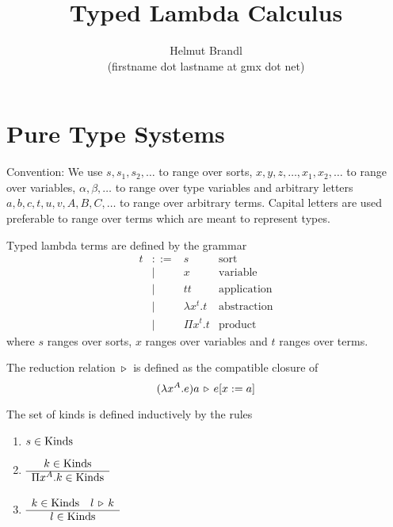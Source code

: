 \documentclass[12pt]{article}
\begin{document}
\title{Typed Lambda Calculus}
\author{Helmut Brandl \\ \scriptsize (firstname dot lastname at gmx dot net)}
\date{}


\maketitle

\abstract{
}

\tableofcontents




\newpage
\section{Pure Type Systems}

Convention: We use $s,s_1,s_2,\ldots$ to range over sorts,
$x,y,z,\ldots,x_1,x_2,\ldots$ to range over variables, $\alpha,\beta,\ldots$
to range over type variables and arbitrary letters $a,b,c,t,u,v,A,B,C,\ldots$
to range over arbitrary terms. Capital letters are used preferable to range
over terms which are meant to represent types.

\begin{definition}
  Typed lambda terms are defined by the grammar
  $$
  \begin{array}{llll}
    t &::=& s                 &\text{sort}
    \\
      &\mid& x                &\text{variable}
    \\
      &\mid& t t              &\text{application}
    \\
      &\mid& \lambda x^t.t    &\text{abstraction}
    \\
      &\mid& \Pi x^t.t        &\text{product}
  \end{array}
  $$
  where $s$ ranges over sorts, $x$ ranges over variables and $t$ ranges over
  terms.
\end{definition}


\begin{definition}
  The reduction relation $\,\triangleright\,$ is defined as the compatible closure
  of
  $$
  (\lambda x^A. e) a \,\triangleright\, e[x:=a]
  $$
\end{definition}





\begin{definition}
  The set of kinds is defined inductively by the rules
  \begin{enumerate}

  \item $s \in \text{Kinds}$

  \item $\begin{array}{c} k \in \text{Kinds} \\ \hline \Pi x^A.k \in \text{Kinds}\end{array}$

  \item $\begin{array}{c} k \in \text{Kinds} \quad l \,\triangleright\, k \\ \hline l \in \text{Kinds}\end{array}$
  \end{enumerate}

\end{definition}
\end{document}
